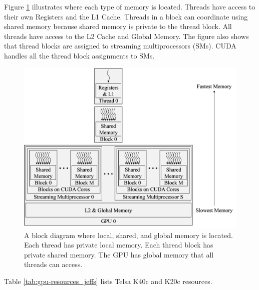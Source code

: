 Figure \ref{fig:fullGPUmemBlockDiagram} illustrates where each type of memory is located.
Threads have access to their own Registers and the L1 Cache.
Threads in a block can coordinate using shared memory because shared memory is private to the thread block.
All threads have access to the L2 Cache and Global Memory.
The figure also shows that thread blocks are assigned to streaming multiprocessors (SMs).
CUDA handles all the thread block assignments to SMs.
\begin{figure}
	\centering\includegraphics[width=9.83in/100*55]{figures/gpu_intro/fullGPUmemBlockDiagram.pdf}
	\caption{A block diagram where local, shared, and global memory is located. Each thread has private local memory. Each thread block has private shared memory. The GPU has global memory that all threads can access.}
	\label{fig:fullGPUmemBlockDiagram}
\end{figure}
Table \ref{tab:gpu-resources_jeffs} lists Telsa K40c and K20c resources.
